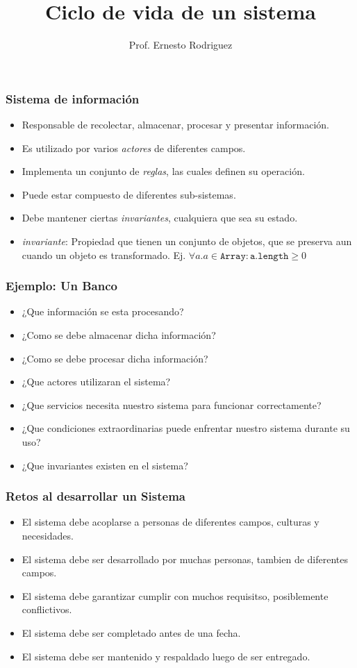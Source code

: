 \documentclass{beamer}
\title[Ciclo de vida]{Ciclo de vida de un sistema}
\author{Prof. Ernesto Rodriguez}
\institute{
    Universidad del Itsmo \\
    \medskip \textit{erodriguez@unis.edu.gt}
}
\date[\today]{}
\begin{document}
\begin{frame}
\titlepage
\end{frame}

\begin{frame}
    \frametitle{Sistema de informaci\'on}
    \begin{itemize}
        \item{Responsable de recolectar, almacenar, procesar y presentar informaci\'on.}
        \item{Es utilizado por varios \emph{actores} de diferentes campos.}
        \item{Implementa un conjunto de \emph{reglas}, las cuales definen su operaci\'on.}
        \item{Puede estar compuesto de diferentes sub-sistemas.}
        \item{Debe mantener ciertas \emph{invariantes}, cualquiera que sea su estado.}
        \item{\emph{invariante}: Propiedad que tienen un conjunto de objetos, que se preserva aun cuando un objeto es transformado. Ej. $\forall a . a \in \mathtt{Array}:\mathtt{a.length} \geq 0$ }
    \end{itemize}

\end{frame}

\begin{frame}
    \frametitle{Ejemplo: Un Banco}
    \begin{itemize}
        \item{¿Que información se esta procesando?}
        \item{¿Como se debe almacenar dicha informaci\'on?}
        \item{¿Como se debe procesar dicha informaci\'on?}
        \item{¿Que actores utilizaran el sistema?}
        \item{¿Que servicios necesita nuestro sistema para funcionar correctamente?}
        \item{¿Que condiciones extraordinarias puede enfrentar nuestro sistema durante su uso?}
        \item{¿Que invariantes existen en el sistema?}
    \end{itemize}
\end{frame}

\begin{frame}
    \frametitle{Retos al desarrollar un Sistema}
    \begin{itemize}
        \item{El sistema debe acoplarse a personas de diferentes campos, culturas y necesidades.}
        \item{El sistema debe ser desarrollado por muchas personas, tambien de diferentes campos.}
        \item{El sistema debe garantizar cumplir con muchos requisitso, posiblemente conflictivos.}
        \item{El sistema debe ser completado antes de una fecha.}
        \item{El sistema debe ser mantenido y respaldado luego de ser entregado.}
    \end{itemize}
\end{frame}
\end{document}
